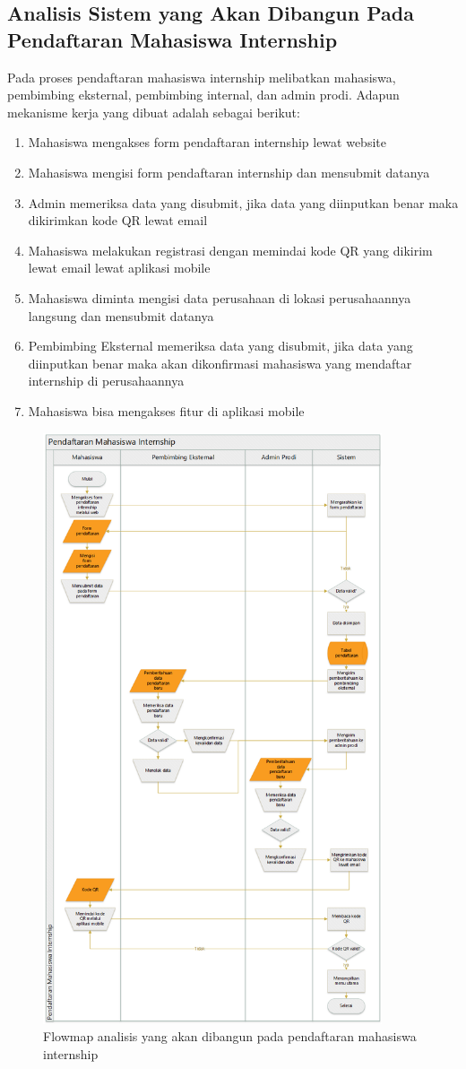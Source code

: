 \subsection{Analisis Sistem yang Akan Dibangun Pada Pendaftaran Mahasiswa Internship}
Pada proses pendaftaran mahasiswa internship melibatkan mahasiswa, pembimbing eksternal, pembimbing internal, dan admin prodi. Adapun mekanisme kerja yang dibuat adalah sebagai berikut:
\begin{enumerate}
	\item Mahasiswa mengakses form pendaftaran internship lewat website
	\item Mahasiswa mengisi form pendaftaran internship dan mensubmit datanya
	\item Admin memeriksa data yang disubmit, jika data yang diinputkan benar maka dikirimkan kode QR lewat email
	\item Mahasiswa melakukan registrasi dengan memindai kode QR yang dikirim lewat email lewat aplikasi mobile
	\item Mahasiswa diminta mengisi data perusahaan di lokasi perusahaannya langsung dan mensubmit datanya
	\item Pembimbing Eksternal memeriksa data yang disubmit, jika data yang diinputkan benar maka akan dikonfirmasi mahasiswa yang mendaftar internship di perusahaannya
	\item Mahasiswa bisa mengakses fitur di aplikasi mobile
\end{enumerate}
	\begin{figure}[H]
		\includegraphics[width=10cm]{figures/image020.png}
		\centering
		\caption{Flowmap analisis yang akan dibangun pada pendaftaran mahasiswa internship }
	\end{figure}
